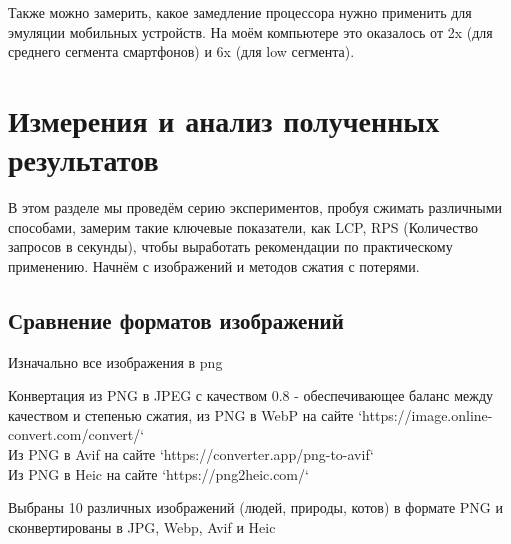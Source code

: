\documentclass[12pt]{article}
\begin{document}
Также можно замерить, какое замедление процессора нужно применить для эмуляции мобильных устройств. На моём компьютере это оказалось от 2x (для среднего сегмента смартфонов) и 6x (для low сегмента).

\section{Измерения и анализ полученных результатов}

В этом разделе мы проведём серию экспериментов, пробуя сжимать различными способами,
замерим такие ключевые показатели, как LCP, RPS (Количество запросов в секунды), чтобы
выработать рекомендации по практическому применению. Начнём с изображений и методов сжатия
с потерями.

\subsection{Сравнение форматов изображений}

Изначально все изображения в png

Конвертация из PNG в JPEG с качеством 0.8 - обеспечивающее баланс между качеством
и степенью сжатия, из PNG в WebP на сайте `https://image.online-convert.com/convert/`\\
Из PNG в Avif на сайте `https://converter.app/png-to-avif`\\
Из PNG в Heic на сайте `https://png2heic.com/`

Выбраны 10 различных изображений (людей, природы, котов)
в формате PNG и сконвертированы в JPG, Webp, Avif и Heic
\end{document}
